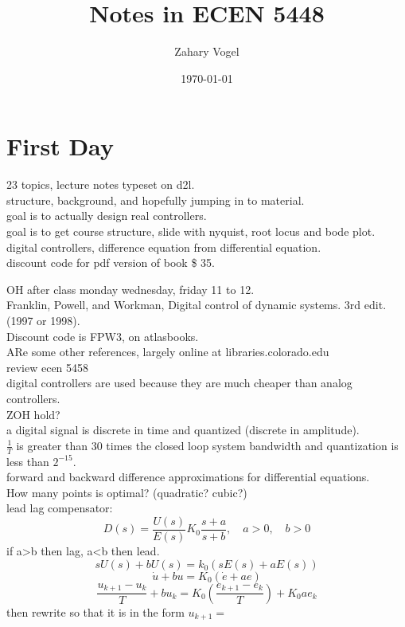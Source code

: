 \documentclass{article}
\author{Zahary Vogel}
\date{\today}
\title{Notes in ECEN 5448}
\begin{document}
\maketitle


\section*{First Day}
23 topics, lecture notes typeset on d2l.\\
structure, background, and hopefully jumping in to material.\\

goal is to actually design real controllers.\\
goal is to get course structure, slide with nyquist, root locus and bode plot.\\
digital controllers, difference equation from differential equation.\\
discount code for pdf version of book \$ 35.

OH after class monday wednesday, friday 11 to 12.\\

Franklin, Powell, and Workman, Digital control of dynamic systems. 3rd edit. (1997 or 1998).\\
Discount code is FPW3, on atlasbooks.\\
ARe some other references, largely online at libraries.colorado.edu\\

review ecen 5458\\

digital controllers are used because they are much cheaper than analog controllers.\\
ZOH hold?\\

a digital signal is discrete in time and quantized (discrete in amplitude).\\

$\frac{1}{T}$ is greater than 30 times the closed loop system bandwidth and quantization is less than $2^{-15}$.\\

forward and backward difference approximations for differential equations.\\
How many points is optimal? (quadratic? cubic?)\\

lead lag compensator:
\[D(s)=\frac{U(s)}{E(s)}K_0\frac{s+a}{s+b},\quad a>0,\quad b>0\]
if a>b then lag, a<b then lead.\\
\[sU(s)+bU(s)=k_0(sE(s)+aE(s))\]
\[\dot{u}+bu=K_0(\dot{e}+ae)\]
\[\frac{u_{k+1}-u_k}{T}+bu_k=K_0\left (\frac{e_{k+1}-e_k}{T}\right )+K_0ae_k\]
then rewrite so that it is in the form $u_{k+1}=$\\
\end{document}
